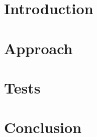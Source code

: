 \documentclass[a4paper, english, 10pt]{report}
\begin{document}
\chapter{Introduction}
\label{ch:Introduction}


\chapter{Approach}
\label{ch:Approach}


\chapter{Tests}
\label{ch:Tests}


\chapter{Conclusion}
\label{ch:Conclusion}




\begin{appendices}

\end{appendices}
 
\end{document}
